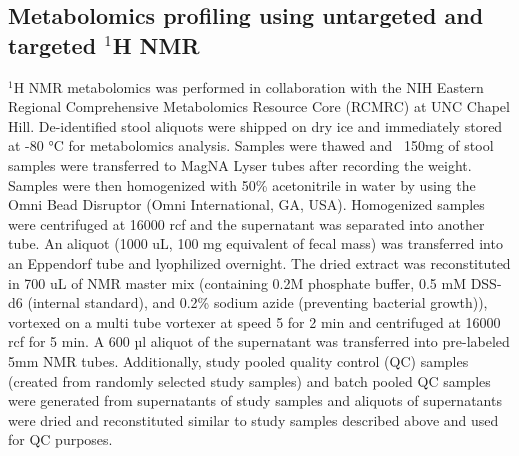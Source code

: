 \subsection{Metabolomics profiling using untargeted and targeted $^1$H NMR}
$^1$H NMR metabolomics was performed in collaboration with the NIH Eastern Regional Comprehensive Metabolomics Resource Core (RCMRC) at UNC Chapel Hill. De-identified stool aliquots were shipped on dry ice and immediately stored at -80 °C for metabolomics analysis. Samples were thawed and ~150mg of stool samples were transferred to MagNA Lyser tubes after recording the weight.  Samples were then homogenized with 50\% acetonitrile in water by using the Omni Bead Disruptor (Omni International, GA, USA). Homogenized samples were centrifuged at 16000 rcf and the supernatant was separated into another tube. An aliquot (1000 uL, 100 mg equivalent of fecal mass) was transferred into an Eppendorf tube and lyophilized overnight. The dried extract was reconstituted in 700 uL of NMR master mix (containing 0.2M phosphate buffer, 0.5 mM DSS-d6 (internal standard), and 0.2\% sodium azide (preventing bacterial growth)), vortexed on a multi tube vortexer at speed 5 for 2 min and centrifuged at 16000 rcf for 5 min. A 600 µl aliquot of the supernatant was transferred into pre-labeled 5mm NMR tubes. Additionally, study pooled quality control (QC) samples (created from randomly selected study samples) and batch pooled QC samples were generated from supernatants of study samples and aliquots of supernatants were dried and reconstituted similar to study samples described above and used for QC purposes. 
